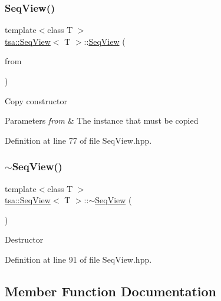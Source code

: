 \subsubsection{\texorpdfstring{Seq\+View()}{SeqView()}\hspace{0.1cm}{\footnotesize\ttfamily [3/3]}}
{\footnotesize\ttfamily template$<$class T $>$ \\
\hyperlink{classtsa_1_1_seq_view}{tsa\+::\+Seq\+View}$<$ T $>$\+::\hyperlink{classtsa_1_1_seq_view}{Seq\+View} (\begin{DoxyParamCaption}\item[{const \hyperlink{classtsa_1_1_seq_view}{Seq\+View}$<$ T $>$ \&}]{from }\end{DoxyParamCaption})\hspace{0.3cm}{\ttfamily [inline]}}

Copy constructor


\begin{DoxyParams}{Parameters}
{\em from} & The instance that must be copied \\
\hline
\end{DoxyParams}


Definition at line 77 of file Seq\+View.\+hpp.

\mbox{\label{classtsa_1_1_seq_view_a92d9c5d9ae07e3b648469cf2a642b813}} 
\subsubsection{\texorpdfstring{$\sim$\+Seq\+View()}{~SeqView()}}
{\footnotesize\ttfamily template$<$class T $>$ \\
\hyperlink{classtsa_1_1_seq_view}{tsa\+::\+Seq\+View}$<$ T $>$\+::$\sim$\hyperlink{classtsa_1_1_seq_view}{Seq\+View} (\begin{DoxyParamCaption}{ }\end{DoxyParamCaption})\hspace{0.3cm}{\ttfamily [inline]}}

Destructor 

Definition at line 91 of file Seq\+View.\+hpp.



\subsection{Member Function Documentation}
\mbox{\label{classtsa_1_1_seq_view_a336812c82ae6a5f415b9850295245fa6}} 
